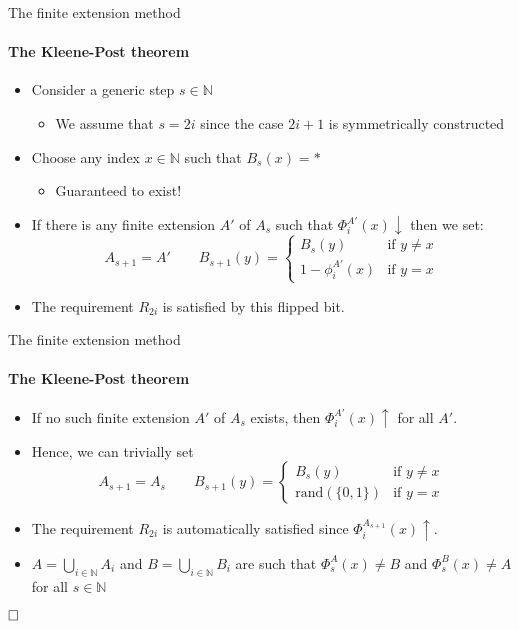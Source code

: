 \documentclass{beamer}
\newcommand{\N}{\mathbb{N}}                     %
\begin{document}
\begin{frame}{The finite extension method}
\framesubtitle{The Kleene-Post theorem}
    \begin{itemize}[<+->]
        \item Consider a generic step $s \in \N$
        \begin{itemize}
            \item We assume that $s = 2i$ since the case $2i+1$ is symmetrically constructed
        \end{itemize}
        \item Choose any index $x \in \N$ such that $B_s(x) = *$
        \begin{itemize}
            \item Guaranteed to exist!
        \end{itemize}
        \item If there is any finite extension $A'$ of $A_s$ such that $\Phi_i^{A'}(x) \downarrow$ then we set:
        \[A_{s+1} = A' \qquad B_{s+1}(y) = \left \{ \begin{array}{ll}
            B_s(y) & \text{if } y \neq x \\
            1-\phi_{i}^{A'}(x) & \text{if } y = x
        \end{array}\right .\]
        \item The requirement $R_{2i}$ is satisfied by this flipped bit.
    \end{itemize}
\end{frame}

\begin{frame}{The finite extension method}
\framesubtitle{The Kleene-Post theorem}
    \begin{itemize}[<+->]
        \item If no such finite extension $A'$ of $A_s$ exists, then $\Phi_i^{A'}(x) \uparrow$ for all $A'$.
        \item Hence, we can trivially set
        \[A_{s+1} = A_{s} \qquad B_{s+1}(y) = \left \{ \begin{array}{ll}
            B_s(y) & \text{if } y \neq x \\
            \mathrm{rand}(\{0,1\}) & \text{if } y = x
        \end{array}\right .\]
        \item The requirement $R_{2i}$ is automatically satisfied since $\Phi_i^{A_{s+1}}(x) \uparrow$.
        \item $A = \bigcup\limits_{i \in \N} A_i$ and $B = \bigcup\limits_{i \in \N} B_i$ are such that $\Phi_s^A(x) \neq B$ and $\Phi_s^B(x) \neq A$ for all $s \in \N$
    \end{itemize}
    $\hfill \square$
\end{frame}
\end{document}
